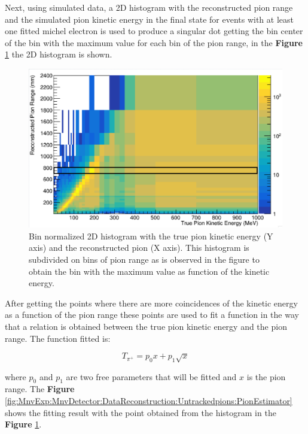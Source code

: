 Next, using simulated data, a 2D histogram with the reconstructed pion range and the simulated pion kinetic energy in the final state for events with at least one fitted michel electron is used to produce a singular dot getting the bin center of the bin with the maximum value for each bin of the pion range, in the \textbf{Figure} \ref{fig:MnvExp:MnvDetector:DataReconstruction:Untrackedpions:TpivsPionRange} the 2D histogram is shown.

\begin{figure}[!htb]
    \centering
    \includegraphics[scale=0.33]{Figures/Chapter2/TpivsPionRange.png}
    \caption{Bin normalized 2D histogram with the true pion kinetic energy (Y axis) and the reconstructed pion (X axis). This histogram is subdivided on bins of pion range as is observed in the figure to obtain the bin with the maximum value as function of the kinetic energy. }
    \label{fig:MnvExp:MnvDetector:DataReconstruction:Untrackedpions:TpivsPionRange}
\end{figure}

After getting the points where there are more coincidences of the kinetic energy as a function of the pion range these points are used to fit a function in the way that a relation is obtained between the true pion kinetic energy and the pion range. The function fitted is:

\begin{equation}
    T_{\pi^+} = p_0 x+p_1 \sqrt{x}
\end{equation}

where $p_0$ and $p_1$ are two free parameters that will be fitted and $x$ is the pion range. The \textbf{Figure} \ref{fig:MnvExp:MnvDetector:DataReconstruction:Untrackedpions:PionEstimator} shows the fitting result with the point obtained from the histogram in the \textbf{Figure} \ref{fig:MnvExp:MnvDetector:DataReconstruction:Untrackedpions:TpivsPionRange}.

